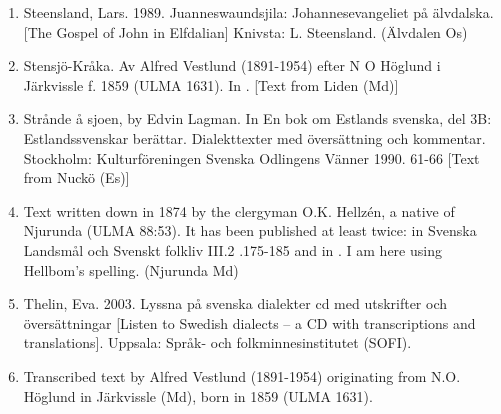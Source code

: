 \begin{enumerate}
\item[\sqbrSenum]

\label{bkm:Ref150065761}Steensland, Lars. 1989. Juanneswaundsjila: Johannesevangeliet på älvdalska. [The Gospel of John in Elfdalian] Knivsta: L. Steensland. (Älvdalen Os)

\item[\sqbrSenum]

\label{bkm:Ref154221412}\label{bkm:Ref154302630}Stensjö-Kråka. Av Alfred Vestlund (1891-1954) efter N O Höglund i Järkvissle f. 1859 (ULMA 1631). In \citet[17-19]{Hellbom1980}. [Text from Liden (Md)]

\item[\sqbrSenum]

\label{bkm:Ref223343666}Strånde å sjoen, by Edvin Lagman. In En bok om Estlands svenska, del 3B: Estlandssvenskar berättar. Dialekttexter med översättning och kommentar. Stockholm: Kulturföreningen Svenska Odlingens Vänner 1990.  61-66 [Text from Nuckö (Es)]

\item[\sqbrSenum]

Text written down in 1874 by the clergyman O.K. Hellzén, a native of Njurunda (ULMA 88:53). It has been published at least twice: in Svenska Landsmål och Svenskt folkliv III.2 .175-185 and in \citet[92-107]{Hellbom1980}. I am here using Hellbom’s spelling. (Njurunda Md)

\item[\sqbrSenum]

Thelin, Eva. 2003. Lyssna på svenska dialekter cd med utskrifter och översättningar [Listen to Swedish dialects – a CD with transcriptions and translations]. Uppsala: Språk- och folkminnesinstitutet (SOFI).


\item[\sqbrSenum]

Transcribed text by Alfred Vestlund (1891-1954) originating from N.O. Höglund in Järkvissle (Md), born in 1859 (ULMA 1631).


\end{enumerate}
